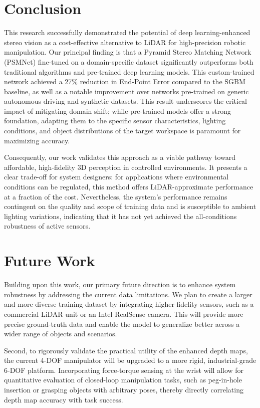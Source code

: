 \documentclass[conference]{IEEEtran}
\begin{document}
\section{Conclusion}
This research successfully demonstrated the potential of deep learning-enhanced stereo vision as a cost-effective alternative to LiDAR for high-precision robotic manipulation. Our principal finding is that a Pyramid Stereo Matching Network (PSMNet) fine-tuned on a domain-specific dataset significantly outperforms both traditional algorithms and pre-trained deep learning models. This custom-trained network achieved a 27\% reduction in End-Point Error compared to the SGBM baseline, as well as a notable improvement over networks pre-trained on generic autonomous driving and synthetic datasets. This result underscores the critical impact of mitigating domain shift; while pre-trained models offer a strong foundation, adapting them to the specific sensor characteristics, lighting conditions, and object distributions of the target workspace is paramount for maximizing accuracy.

Consequently, our work validates this approach as a viable pathway toward affordable, high-fidelity 3D perception in controlled environments. It presents a clear trade-off for system designers: for applications where environmental conditions can be regulated, this method offers LiDAR-approximate performance at a fraction of the cost. Nevertheless, the system's performance remains contingent on the quality and scope of training data and is susceptible to ambient lighting variations, indicating that it has not yet achieved the all-conditions robustness of active sensors.

\section{Future Work}
Building upon this work, our primary future direction is to enhance system robustness by addressing the current data limitations. We plan to create a larger and more diverse training dataset by integrating higher-fidelity sensors, such as a commercial LiDAR unit or an Intel RealSense camera. This will provide more precise ground-truth data and enable the model to generalize better across a wider range of objects and scenarios.

Second, to rigorously validate the practical utility of the enhanced depth maps, the current 4-DOF manipulator will be upgraded to a more rigid, industrial-grade 6-DOF platform. Incorporating force-torque sensing at the wrist will allow for quantitative evaluation of closed-loop manipulation tasks, such as peg-in-hole insertion or grasping objects with arbitrary poses, thereby directly correlating depth map accuracy with task success.
\end{document}
